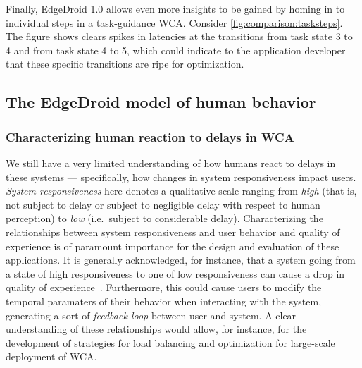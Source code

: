 Finally, EdgeDroid 1.0 allows even more insights to be gained by homing in to individual steps in a task-guidance WCA. Consider \cref{fig:comparison:tasksteps}.
The figure shows clears spikes in latencies at the transitions from task state 3 to 4 and from task state 4 to 5, which could indicate to the application developer that these specific transitions are ripe for optimization.

\subsection{The EdgeDroid model of human behavior}


\subsubsection{Characterizing human reaction to delays in \ac{WCA}}


We still have a very limited understanding of how humans react to delays in these systems --- specifically, how changes in system responsiveness impact users.
\emph{System responsiveness} here denotes a qualitative scale ranging from \emph{high} (that is, not subject to delay or subject to negligible delay with respect to human perception) to \emph{low} (i.e.\ subject to considerable delay).
Characterizing the relationships between system responsiveness and user behavior and quality of experience is of paramount importance for the design and evaluation of these applications.
It is generally acknowledged, for instance, that a system going from a state of high responsiveness to one of low responsiveness can cause a drop in quality of experience~\cite{dabrowsky:2011:40years}. 
Furthermore, this could cause users to modify the temporal paramaters of their behavior when interacting with the system, generating a sort of \emph{feedback loop} between user and system.
A clear understanding of these relationships would allow, for instance, for the development of strategies for load balancing and optimization for large-scale deployment of WCA.\@

